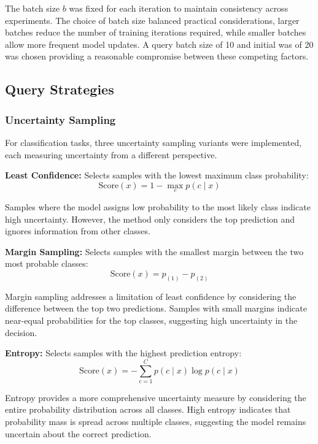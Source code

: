 \documentclass[conference]{IEEEtran}
\begin{document}
The batch size $b$ was fixed for each iteration to maintain consistency across experiments. The choice of batch size balanced practical considerations, larger batches reduce the number of training iterations required, while smaller batches allow more frequent model updates. A query batch size of 10 and initial was of 20 was chosen providing a reasonable compromise between these competing factors.

\subsection{Query Strategies}

\subsubsection{Uncertainty Sampling}

For classification tasks, three uncertainty sampling variants were implemented, each measuring uncertainty from a different perspective.

\textbf{Least Confidence:} Selects samples with the lowest maximum class probability:
\begin{equation}
\text{Score}(x) = 1 - \max_c p(c \mid x)
\end{equation}

Samples where the model assigns low probability to the most likely class indicate high uncertainty. However, the method only considers the top prediction and ignores information from other classes.

\textbf{Margin Sampling:} Selects samples with the smallest margin between the two most probable classes:
\begin{equation}
\text{Score}(x) = p_{(1)} - p_{(2)}
\end{equation}

Margin sampling addresses a limitation of least confidence by considering the difference between the top two predictions. Samples with small margins indicate near-equal probabilities for the top classes, suggesting high uncertainty in the decision.

\textbf{Entropy:} Selects samples with the highest prediction entropy:
\begin{equation}
\text{Score}(x) = -\sum_{c=1}^C p(c \mid x) \log p(c \mid x)
\end{equation}

Entropy provides a more comprehensive uncertainty measure by considering the entire probability distribution across all classes. High entropy indicates that probability mass is spread across multiple classes, suggesting the model remains uncertain about the correct prediction.
\end{document}
